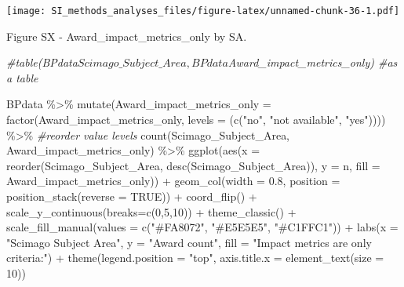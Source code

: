 \documentclass[
]{article}
\newenvironment{Shaded}{\begin{snugshade}}{\end{snugshade}}
\newcommand{\AttributeTok}[1]{\textcolor[rgb]{0.77,0.63,0.00}{#1}}
\newcommand{\CommentTok}[1]{\textcolor[rgb]{0.56,0.35,0.01}{\textit{#1}}}
\newcommand{\ConstantTok}[1]{\textcolor[rgb]{0.00,0.00,0.00}{#1}}
\newcommand{\DecValTok}[1]{\textcolor[rgb]{0.00,0.00,0.81}{#1}}
\newcommand{\FloatTok}[1]{\textcolor[rgb]{0.00,0.00,0.81}{#1}}
\newcommand{\FunctionTok}[1]{\textcolor[rgb]{0.00,0.00,0.00}{#1}}
\newcommand{\NormalTok}[1]{#1}
\newcommand{\SpecialCharTok}[1]{\textcolor[rgb]{0.00,0.00,0.00}{#1}}
\newcommand{\StringTok}[1]{\textcolor[rgb]{0.31,0.60,0.02}{#1}}
\begin{document}
\texttt{[image: SI\_methods\_analyses\_files/figure-latex/unnamed-chunk-36-1.pdf]}

Figure SX - Award\_impact\_metrics\_only by SA.

\begin{Shaded}
\begin{Highlighting}[]
\CommentTok{\#table(BPdata$Scimago\_Subject\_Area, BPdata$Award\_impact\_metrics\_only) \#as a table}

\NormalTok{BPdata }\SpecialCharTok{\%\textgreater{}\%} 
    \FunctionTok{mutate}\NormalTok{(}\AttributeTok{Award\_impact\_metrics\_only =} \FunctionTok{factor}\NormalTok{(Award\_impact\_metrics\_only, }\AttributeTok{levels =}\NormalTok{ (}\FunctionTok{c}\NormalTok{(}\StringTok{"no"}\NormalTok{, }\StringTok{"not available"}\NormalTok{, }\StringTok{"yes"}\NormalTok{)))) }\SpecialCharTok{\%\textgreater{}\%} \CommentTok{\#reorder value levels}
    \FunctionTok{count}\NormalTok{(Scimago\_Subject\_Area, Award\_impact\_metrics\_only) }\SpecialCharTok{\%\textgreater{}\%}
    \FunctionTok{ggplot}\NormalTok{(}\FunctionTok{aes}\NormalTok{(}\AttributeTok{x =} \FunctionTok{reorder}\NormalTok{(Scimago\_Subject\_Area, }\FunctionTok{desc}\NormalTok{(Scimago\_Subject\_Area)), }\AttributeTok{y =}\NormalTok{ n, }\AttributeTok{fill =}\NormalTok{ Award\_impact\_metrics\_only)) }\SpecialCharTok{+} 
    \FunctionTok{geom\_col}\NormalTok{(}\AttributeTok{width =} \FloatTok{0.8}\NormalTok{, }\AttributeTok{position =} \FunctionTok{position\_stack}\NormalTok{(}\AttributeTok{reverse =} \ConstantTok{TRUE}\NormalTok{)) }\SpecialCharTok{+}
    \FunctionTok{coord\_flip}\NormalTok{() }\SpecialCharTok{+}
    \FunctionTok{scale\_y\_continuous}\NormalTok{(}\AttributeTok{breaks=}\FunctionTok{c}\NormalTok{(}\DecValTok{0}\NormalTok{,}\DecValTok{5}\NormalTok{,}\DecValTok{10}\NormalTok{)) }\SpecialCharTok{+}
    \FunctionTok{theme\_classic}\NormalTok{() }\SpecialCharTok{+} 
    \FunctionTok{scale\_fill\_manual}\NormalTok{(}\AttributeTok{values =} \FunctionTok{c}\NormalTok{(}\StringTok{"\#FA8072"}\NormalTok{, }\StringTok{"\#E5E5E5"}\NormalTok{, }\StringTok{"\#C1FFC1"}\NormalTok{)) }\SpecialCharTok{+}
    \FunctionTok{labs}\NormalTok{(}\AttributeTok{x =} \StringTok{"Scimago Subject Area"}\NormalTok{, }\AttributeTok{y =} \StringTok{"Award count"}\NormalTok{, }\AttributeTok{fill =} \StringTok{"Impact metrics are only criteria:"}\NormalTok{) }\SpecialCharTok{+} 
    \FunctionTok{theme}\NormalTok{(}\AttributeTok{legend.position =} \StringTok{"top"}\NormalTok{, }\AttributeTok{axis.title.x =} \FunctionTok{element\_text}\NormalTok{(}\AttributeTok{size =} \DecValTok{10}\NormalTok{))}
\end{Highlighting}
\end{Shaded}
\end{document}
